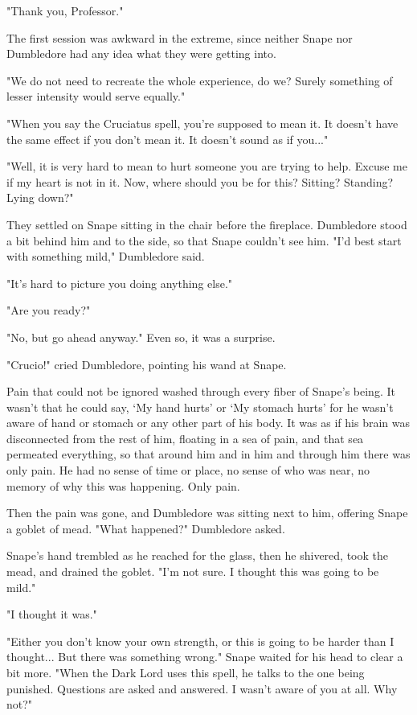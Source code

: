 "Thank you, Professor."

The first session was awkward in the extreme, since neither Snape nor Dumbledore had any idea what they were getting into.

"We do not need to recreate the whole experience, do we? Surely something of lesser intensity would serve equally."

"When you say the Cruciatus spell, you're supposed to mean it. It doesn't have the same effect if you don't mean it. It doesn't sound as if you..."

"Well, it is very hard to mean to hurt someone you are trying to help. Excuse me if my heart is not in it. Now, where should you be for this? Sitting? Standing? Lying down?"

They settled on Snape sitting in the chair before the fireplace. Dumbledore stood a bit behind him and to the side, so that Snape couldn't see him. "I'd best start with something mild," Dumbledore said.

"It's hard to picture you doing anything else."

"Are you ready?"

"No, but go ahead anyway." Even so, it was a surprise.

"Crucio!" cried Dumbledore, pointing his wand at Snape.

Pain that could not be ignored washed through every fiber of Snape's being. It wasn't that he could say, `My hand hurts' or `My stomach hurts' for he wasn't aware of hand or stomach or any other part of his body. It was as if his brain was disconnected from the rest of him, floating in a sea of pain, and that sea permeated everything, so that around him and in him and through him there was only pain. He had no sense of time or place, no sense of who was near, no memory of why this was happening. Only pain.

Then the pain was gone, and Dumbledore was sitting next to him, offering Snape a goblet of mead. "What happened?" Dumbledore asked.

Snape's hand trembled as he reached for the glass, then he shivered, took the mead, and drained the goblet. "I'm not sure. I thought this was going to be mild."

"I thought it was."

"Either you don't know your own strength, or this is going to be harder than I thought... But there was something wrong." Snape waited for his head to clear a bit more. "When the Dark Lord uses this spell, he talks to the one being punished. Questions are asked and answered. I wasn't aware of you at all. Why not?"


